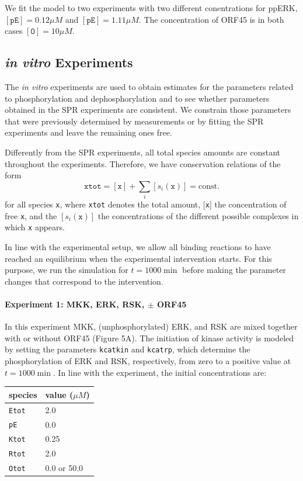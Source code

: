 \documentclass[12pt]{article}
\begin{document}
	We fit the model to two experiments with two different conentrations
	for ppERK, $[\texttt{pE}]=0.12\mu M$ and $[\texttt{pE}]=1.11\mu M$.
	The concentration of ORF45 is in both cases $[\texttt{O}]=10\mu M$.
	
	\subsection{\textit{in vitro} Experiments}
	
	The \textit{in vitro} experiments are used to obtain estimates for
	the parameters related to phosphorylation and dephosphorylation and
	to see whether parameters obtained in the SPR experiments are consistent.
	We constrain those parameters that were previously determined by measurements
	or by fitting the SPR experiments and leave the remaining ones free.
	
	Differently from the SPR experiments, all total species amounts are
	constant throughout the experiments. Therefore, we have conservation
	relations of the form 
	\begin{equation}
		\texttt{xtot}=[\texttt{x}]+\sum_{i}[s_{i}(\texttt{x})]=\text{const.}
	\end{equation}
	for all species \texttt{x}, where \texttt{xtot} denotes the total
	amount, {[}\texttt{x}{]} the concentration of free \texttt{x}, and
	the $[s_{i}(\texttt{x})]$ the concentrations of the different possible
	complexes in which \texttt{x} appears.
	
	In line with the experimental setup, we allow all binding reactions
	to have reached an equilibrium when the experimental intervention
	starts. For this purpose, we run the simulation for $t=1000\min$
	before making the parameter changes that correspond to the intervention.
	
	\paragraph{Experiment 1: MKK, ERK, RSK, $\pm$ ORF45}
	
	In this experiment MKK, (unphosphorylated) ERK, and RSK are mixed
	together with or without ORF45 (Figure 5A). The initiation of kinase
	activity is modeled by setting the parameters \texttt{kcatkin} and
	\texttt{kcatrp}, which determine the phosphorylation of ERK and RSK,
	respectively, from zero to a positive value at $t=1000\min$. In line
	with the experiment, the initial concentrations are: 
	\begin{center}
		\begin{tabular}{ll}
			species  & value ($\mu M$)\\
			\midrule 
			\texttt{Etot}  & 2.0\\
			\texttt{pE}  & 0.0 \\
			\texttt{Ktot}  & 0.25\\
			\texttt{Rtot}  & 2.0 \\
			\texttt{Otot}  & 0.0 or 50.0\\
		\end{tabular}
		\par\end{center}
	
\end{document}
